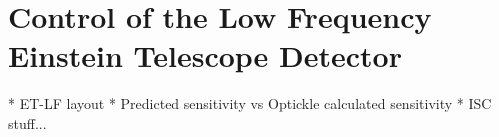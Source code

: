 \chapter{Control of the Low Frequency Einstein Telescope Detector}
\label{c:et-lf-control}

  * ET-LF layout
  * Predicted sensitivity vs Optickle calculated sensitivity
  * ISC stuff...